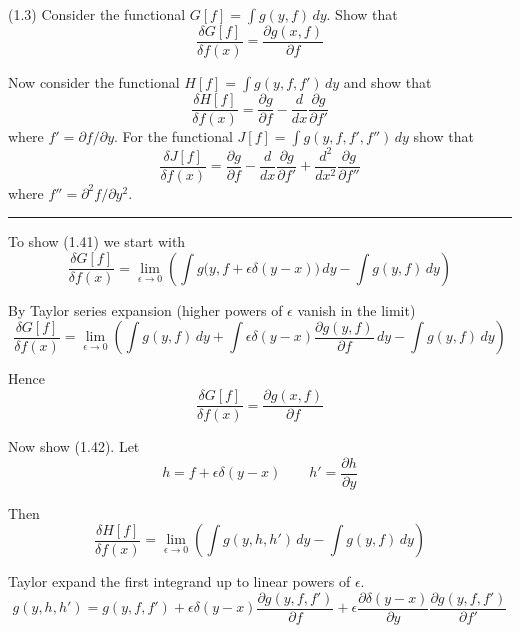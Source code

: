 \documentclass[12pt]{article}
\begin{document}
(1.3)
Consider the functional $G[f]=\int g(y,f)\,dy$.
Show that
\begin{equation*}
\frac{\delta G[f]}{\delta f(x)}=\frac{\partial g(x,f)}{\partial f}
\tag{1.41}
\end{equation*}

Now consider the functional $H[f]=\int g(y,f,f')\,dy$
and show that
\begin{equation*}
\frac{\delta H[f]}{\delta f(x)}=\frac{\partial g}{\partial f}
-\frac{d}{dx}\frac{\partial g}{\partial f'}
\tag{1.42}
\end{equation*}
where $f'=\partial f/\partial y$.
For the functional $J[f]=\int g(y,f,f',f'')\,dy$ show that
\begin{equation*}
\frac{\delta J[f]}{\delta f(x)}
=\frac{\partial g}{\partial f}
-\frac{d}{dx}\frac{\partial g}{\partial f'}
+\frac{d^2}{dx^2}\frac{\partial g}{\partial f''}
\tag{1.43}
\end{equation*}
where $f''=\partial^2 f/\partial y^2$.

\bigskip
\hrule

\bigskip
To show (1.41) we start with
\begin{equation*}
\frac{\delta G[f]}{\delta f(x)}
=\lim_{\epsilon\rightarrow 0}\left(
\int g\big(y,f+\epsilon\delta(y-x)\big)\,dy-\int g(y,f)\,dy
\right)
\end{equation*}

By Taylor series expansion (higher powers of $\epsilon$ vanish in the limit)
\begin{equation*}
\frac{\delta G[f]}{\delta f(x)}
=\lim_{\epsilon\rightarrow 0}
\left(
\int g(y,f)\,dy
+\int\epsilon\delta(y-x)\frac{\partial g(y,f)}{\partial f}\,dy
-\int g(y,f)\,dy
\right)
\end{equation*}

Hence
\begin{equation*}
\frac{\delta G[f]}{\delta f(x)}=\frac{\partial g(x,f)}{\partial f}
\end{equation*}

Now show (1.42).
Let
\begin{equation*}
h=f+\epsilon\delta(y-x)
\qquad
h'=\frac{\partial h}{\partial y}
\end{equation*}

Then
\begin{equation*}
\frac{\delta H[f]}{\delta f(x)}
=\lim_{\epsilon\rightarrow 0}
\left(
\int g(y,h,h')\,dy-\int g(y,f)\,dy
\right)
\end{equation*}

Taylor expand the first integrand up to linear powers of $\epsilon$.
\begin{equation*}
g(y,h,h')=g(y,f,f')
+\epsilon\delta(y-x)\frac{\partial g(y,f,f')}{\partial f}
+\epsilon\frac{\partial\delta(y-x)}{\partial y}\frac{\partial g(y,f,f')}{\partial f'}
\end{equation*}
\end{document}
